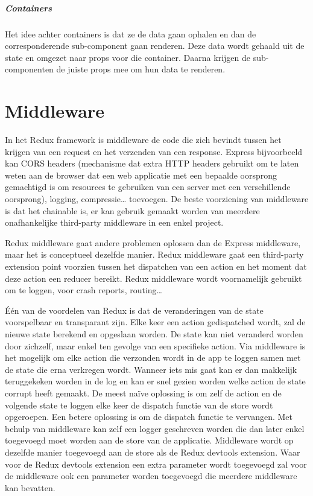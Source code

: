 \subparagraph{Containers}
Het idee achter containers is dat ze de data gaan ophalen en dan de corresponderende sub-component gaan renderen. Deze data wordt gehaald uit de state en omgezet naar props voor die container. Daarna krijgen de sub-componenten de juiste props mee om hun data te renderen. 
\autocite{containercomp}

\section{Middleware}
In het Redux framework is middleware de code die zich bevindt tussen het krijgen van een request en het verzenden van een response. Express bijvoorbeeld kan CORS headers (mechanisme dat extra HTTP headers gebruikt om te laten weten aan de browser dat een web applicatie met een bepaalde oorsprong gemachtigd is om resources te gebruiken van een server met een verschillende oorsprong), logging, compressie… toevoegen. De beste voorziening van middleware is dat het chainable is, er kan gebruik gemaakt worden van meerdere onafhankelijke third-party middleware in een enkel project.
 
Redux middleware gaat andere problemen oplossen dan de Express middleware, maar het is conceptueel dezelfde manier. Redux middleware gaat een third-party extension point voorzien tussen het dispatchen van een action en het moment dat deze action een reducer bereikt. Redux middleware wordt voornamelijk gebruikt om te loggen, voor crash reports, routing…

Één van de voordelen van Redux is dat de veranderingen van de state voorspelbaar en transparant zijn. Elke keer een action gedispatched wordt, zal de nieuwe state berekend en opgeslaan worden. De state kan niet veranderd worden door zichzelf, maar enkel ten gevolge van een specifieke action. Via middleware is het mogelijk om elke action die verzonden wordt in de app te loggen samen met de state die erna verkregen wordt. Wanneer iets mis gaat kan er dan makkelijk teruggekeken worden in de log en kan er snel gezien worden welke action de state corrupt heeft gemaakt. De meest naïve oplossing is om zelf de action en de volgende state te loggen elke keer de dispatch functie van de store wordt opgeroepen. Een betere oplossing is om de dispatch functie te vervangen. Met behulp van middleware kan zelf een logger geschreven worden die dan later enkel toegevoegd moet worden aan de store van de applicatie. Middleware wordt op dezelfde manier toegevoegd aan de store als de Redux devtools extension. Waar voor de Redux devtools extension een extra parameter wordt toegevoegd zal voor de middleware ook een parameter worden toegevoegd die meerdere middleware kan bevatten. 
\autocite{Redux02}


